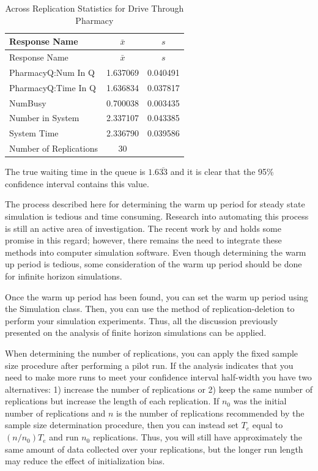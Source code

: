 \documentclass[
]{book}
\theoremstyle{definition}
\theoremstyle{definition}
\theoremstyle{definition}
\theoremstyle{definition}
\theoremstyle{remark}
\begin{document}
\begin{longtable}[]{@{}lcc@{}}
\caption{Across Replication Statistics for Drive Through Pharmacy}\tabularnewline
\toprule
Response Name & \(\bar{x}\) & \(s\) \\
\midrule
\endfirsthead
\toprule
Response Name & \(\bar{x}\) & \(s\) \\
\midrule
\endhead
PharmacyQ:Num In Q & 1.637069 & 0.040491 \\
PharmacyQ:Time In Q & 1.636834 & 0.037817 \\
NumBusy & 0.700038 & 0.003435 \\
Number in System & 2.337107 & 0.043385 \\
System Time & 2.336790 & 0.039586 \\
Number of Replications & 30 & \\
\bottomrule
\end{longtable}

The true waiting time in the queue is \(1.6\bar{33}\) and it is clear that
the 95\% confidence interval contains this value.

The process described here for determining the warm up period for steady
state simulation is tedious and time consuming. Research into automating
this process is still an active area of investigation. The recent work
by \citep{robinson2005automated} and \citet{Rossetti:2005aa} holds some promise in
this regard; however, there remains the need to integrate these methods
into computer simulation software. Even though determining the warm up
period is tedious, some consideration of the warm up period should be
done for infinite horizon simulations.

Once the warm up period has been found, you can set the warm up period
using the Simulation class. Then, you can use the method of
replication-deletion to perform your simulation experiments. Thus, all
the discussion previously presented on the analysis of finite horizon
simulations can be applied.

When determining the number of replications, you can apply the fixed
sample size procedure after performing a pilot run. If the analysis
indicates that you need to make more runs to meet your confidence
interval half-width you have two alternatives: 1) increase the number of
replications or 2) keep the same number of replications but increase the
length of each replication. If \(n_0\) was the initial number of
replications and \(n\) is the number of replications recommended by the
sample size determination procedure, then you can instead set \(T_e\)
equal to \((n/n_0)T_e\) and run \(n_0\) replications. Thus, you will still
have approximately the same amount of data collected over your
replications, but the longer run length may reduce the effect of
initialization bias.
\end{document}
